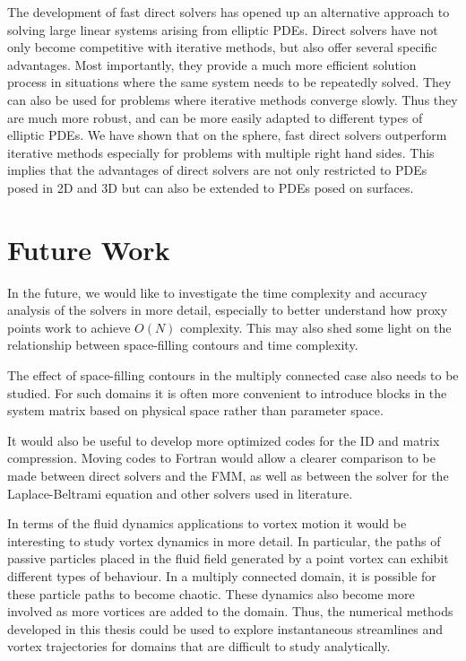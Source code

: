 \documentclass{sfuthesis}
\begin{document}
The development of fast direct solvers has opened up an alternative approach to solving large linear systems arising from elliptic PDEs. Direct solvers have not only become competitive with iterative methods, but also offer several specific advantages. Most importantly, they provide a much more efficient solution process in situations where the same system needs to be repeatedly solved. They can also be used for problems where iterative methods converge slowly. Thus they are much more robust, and can be more easily adapted to different types of elliptic PDEs. We have shown that on the sphere, fast direct solvers outperform iterative methods especially for problems with multiple right hand sides. This implies that the advantages of direct solvers are not only restricted to PDEs posed in 2D and 3D but can also be extended to PDEs posed on surfaces. 

\section{Future Work}
In the future, we would like to investigate the time complexity and accuracy analysis of the solvers in more detail, especially to better understand how proxy points work to achieve $O(N)$ complexity. This may also shed some light on the relationship between space-filling contours and time complexity. 

The effect of space-filling contours in the multiply connected case also needs to be studied. For such domains it is often more convenient to introduce blocks in the system matrix based on physical space rather than parameter space. 

It would also be useful to develop more optimized codes for the ID and matrix compression. Moving codes to Fortran would allow a clearer comparison to be made between direct solvers and the FMM, as well as between the solver for the Laplace-Beltrami equation and other solvers used in literature. 

In terms of the fluid dynamics applications to vortex motion it would be interesting to study vortex dynamics in more detail. In particular, the paths of passive particles placed in the fluid field generated by a point vortex can exhibit different types of behaviour. In a multiply connected domain, it is possible for these particle paths to become chaotic. These dynamics also become more involved as more vortices are added to the domain. Thus, the numerical methods developed in this thesis could be used to explore instantaneous streamlines and vortex trajectories for domains that are difficult to study analytically. 
\end{document}
